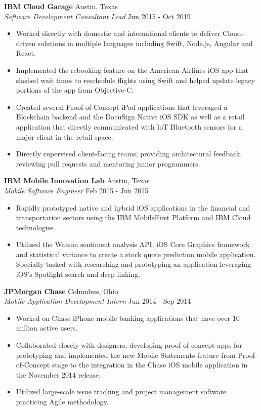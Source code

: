 \documentclass[a4paper]{article}
\begin{document}
\textbf{IBM Cloud Garage} \hfill Austin, Texas\\
\textit{Software Development Consultant Lead} \hfill Jun 2015 - Oct 2019\\
\vspace{-1mm}
\begin{itemize} \itemsep 1pt
	\item Worked directly with domestic and international clients to deliver Cloud-driven solutions in multiple languages including Swift, Node.js, Angular and React.
	\item Implemented the rebooking feature on the American Airlines iOS app that slashed wait times to reschedule flights using Swift and helped update legacy portions of the app from Objective-C. 
	\item Created several Proof-of-Concept iPad applications that leveraged a Blockchain backend and the DocuSign Native iOS SDK as well as a retail application that directly communicated with IoT Bluetooth sensors for a major client in the retail space.
	\item Directly supervised client-facing teams, providing architectural feedback, reviewing pull requests and mentoring junior programmers.
\end{itemize}
\vspace{2mm}
\textbf{IBM Mobile Innovation Lab} \hfill Austin, Texas\\
\textit{Mobile Software Engineer} \hfill Feb 2015 - Jun 2015\\
\vspace{-1mm}
\begin{itemize} \itemsep 1pt
	\item Rapidly prototyped native and hybrid iOS applications in the financial and transportation sectors using the IBM MobileFirst Platform and IBM Cloud technologies. 
	\item Utilized the Watson sentiment analysis API, iOS Core Graphics framework and statistical variance to create a stock quote prediction mobile application. Specially tasked with researching and prototyping an application leveraging iOS’s Spotlight search and deep linking.
\end{itemize}
\vspace{1mm}
\textbf{JPMorgan Chase} \hfill Columbus, Ohio\\
\textit{Mobile Application Development Intern} \hfill Jun 2014 - Sep 2014\\
\vspace{-1mm}
\begin{itemize} \itemsep 1pt
	\item Worked on Chase iPhone mobile banking applications that have over 10 million active users. 
	\item Collaborated closely with designers, developing proof of concept apps for prototyping and implemented the new Mobile Statements feature from Proof-of-Concept stage to the integration in the Chase iOS mobile application in the November 2014 release.
	\item Utilized large-scale issue tracking and project management software practicing Agile methodology.
\end{itemize}
\end{document}
